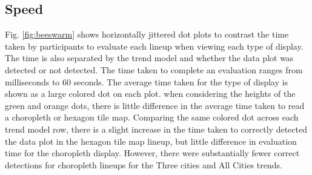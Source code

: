 \documentclass[journal]{vgtc}                     %
\begin{document}
\hypertarget{speed}{%
\subsection{Speed}\label{speed}}

Fig. \ref{fig:beeswarm} shows horizontally jittered dot plots to contrast the time taken by participants to evaluate each lineup when viewing each type of display. The time is also separated by the trend model and whether the data plot was detected or not detected. The time taken to complete an evaluation ranges from milliseconds to 60 seconds. The average time taken for the type of display is shown as a large colored dot on each plot. when considering the heights of the green and orange dots, there is little difference in the average time taken to read a choropleth or hexagon tile map. Comparing the same colored dot across each trend model row, there is a slight increase in the time taken to correctly detected the data plot in the hexagon tile map lineup, but little difference in evaluation time for the choropleth display. However, there were substantially fewer correct detections for choropleth lineups for the Three cities and All Cities trends.
\end{document}
